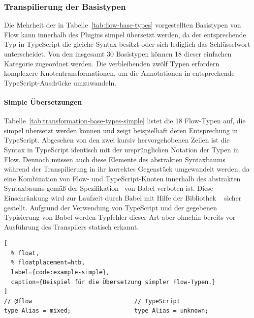 \subsubsection{Transpilierung der Basistypen}

Die Mehrheit der in Tabelle~\ref{tab:flow-base-types} vorgestellten Basistypen von Flow kann innerhalb des Plugins simpel übersetzt werden, da der entsprechende Typ in TypeScript die gleiche Syntax besitzt oder sich lediglich das Schlüsselwort unterscheidet. Von den insgesamt 30 Basistypen können 18 dieser einfachen Kategorie zugeordnet werden. Die verbleibenden zwölf Typen erfordern komplexere Knotentransformationen, um die Annotationen in entsprechende TypeScript-Ausdrücke umzuwandeln.

\vspace{-0.5\baselineskip}
\paragraph{Simple Übersetzungen}

Tabelle~\ref{tab:transformation-base-types-simple} listet die 18 Flow-Typen auf, die simpel übersetzt werden können und zeigt beispielhaft deren Entsprechung in TypeScript. Abgesehen von den zwei kursiv hervorgehobenen Zeilen ist die Syntax in TypeScript identisch mit der ursprünglichen Notation der Typen in Flow. Dennoch müssen auch diese Elemente des abstrakten Syntaxbaums während der Transpilierung in ihr korrektes Gegenstück umgewandelt werden, da eine Kombination von Flow- und TypeScript-Knoten innerhalb des abstrakten Syntaxbaums gemäß der Spezifikation~\autocite{BABEL:PARSER_SPEC} von Babel verboten ist. Diese Einschränkung wird zur Laufzeit durch Babel mit Hilfe der Bibliothek ~\autocite{BABEL:TYPES} sicher gestellt. Aufgrund der Verwendung von TypeScript und der gegebenen Typisierung von Babel werden Typfehler dieser Art aber ohnehin bereits vor Ausführung des Transpilers statisch erkannt.



\begin{lstlisting}[
  % float,
  % floatplacement=htb,
  label={code:example-simple},
  caption={Beispiel für die Übersetzung simpler Flow-Typen.}
]
// @flow                             // TypeScript
type Alias = mixed;                  type Alias = unknown;
\end{lstlisting}

